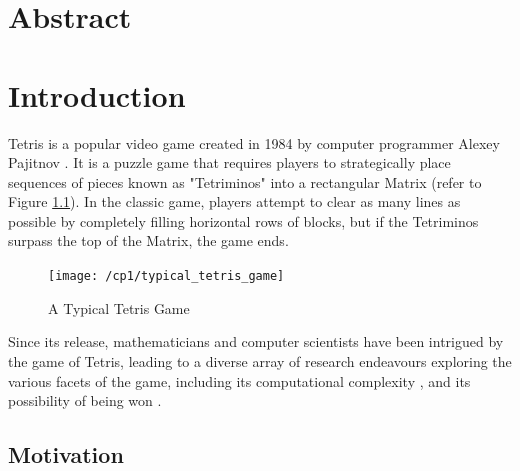 \documentclass[a4paper, 12pt]{extreport}
\begin{document}
	\chapter*{Abstract}
	
	
	\tableofcontents
	
	\chapter{Introduction}
	
		
		Tetris is a popular video game created in 1984 by computer programmer Alexey Pajitnov  \cite{about-tetris}. It is a puzzle game that requires players to strategically place sequences of pieces known as "Tetriminos" into a rectangular Matrix (refer to Figure \ref{tetrisgame}). In the classic game, players attempt to clear as many lines as possible by completely filling horizontal rows of blocks, but if the Tetriminos surpass the top of the Matrix, the game ends.
		
		\begin{figure}[h]
			\centering
			\texttt{[image: /cp1/typical\_tetris\_game]}
			\caption{A Typical Tetris Game}
			\label{tetrisgame}
		\end{figure}
		
		Since its release, mathematicians and computer scientists have been intrigued by the game of Tetris, leading to a diverse array of research endeavours exploring the various facets of the game, including its computational complexity \cite{tetris-is-hard-even-to-approx}, and its possibility of being won \cite{can-you-win-at-tetris} \cite{how-to-lose-at-tetris}.
		
		\section{Motivation}
		
	 		
\end{document}
